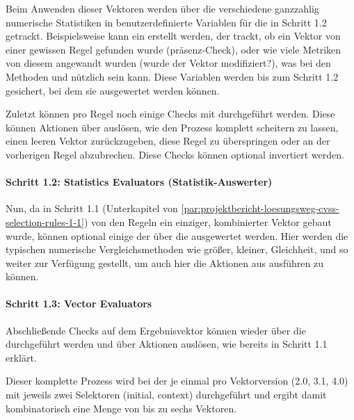 Beim Anwenden dieser Vektoren werden über die  verschiedene ganzzahlig numerische Statistiken in benutzerdefinierte Variablen für die  in Schritt 1.2 getrackt.
Beispielsweise kann ein  erstellt werden, der trackt, ob ein Vektor von einer gewissen Regel gefunden wurde (präsenz-Check), oder wie viele Metriken von diesem angewandt wurden (wurde der Vektor modifiziert?), was bei den Methoden  und  nützlich sein kann.
Diese Variablen werden bis zum Schritt 1.2 gesichert, bei dem sie ausgewertet werden können.

Zuletzt können pro Regel noch einige Checks mit  durchgeführt werden.
Diese können Aktionen über  auslösen, wie den Prozess komplett scheitern zu lassen, einen leeren Vektor zurückzugeben, diese Regel zu überspringen oder an der vorherigen Regel abzubrechen.
Diese Checks können optional invertiert werden.

\paragraph{Schritt 1.2: Statistics Evaluators (Statistik-Auswerter)}

Nun, da in Schritt 1.1 (Unterkapitel von \ref{par:projektbericht-loesungsweg-cvss-selection-rules-1-1}) von den Regeln ein einziger, kombinierter Vektor gebaut wurde, können optional einige der  über die  ausgewertet werden.
Hier werden die typischen numerische Vergleichsmethoden wie größer, kleiner, Gleichheit, und so weiter zur Verfügung gestellt, um auch hier die Aktionen aus  ausführen zu können.

\paragraph{Schritt 1.3: Vector Evaluators}

Abschließende Checks auf dem Ergebnisvektor können wieder über die  durchgeführt werden und über  Aktionen auslösen, wie bereits in Schritt 1.1 erklärt.

Dieser komplette Prozess wird bei der {\metaeffekt} je einmal pro Vektorversion (2.0, 3.1, 4.0) mit jeweils zwei Selektoren (initial, context) durchgeführt und ergibt damit kombinatorisch eine Menge von bis zu sechs Vektoren.

